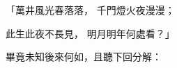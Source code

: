 \begin{showcontents}{}
「萬井風光春落落，  千門燈火夜漫漫；

此生此夜不長見，  明月明年何處看？」

畢竟未知後來何如，且聽下回分解：




\end{showcontents}


